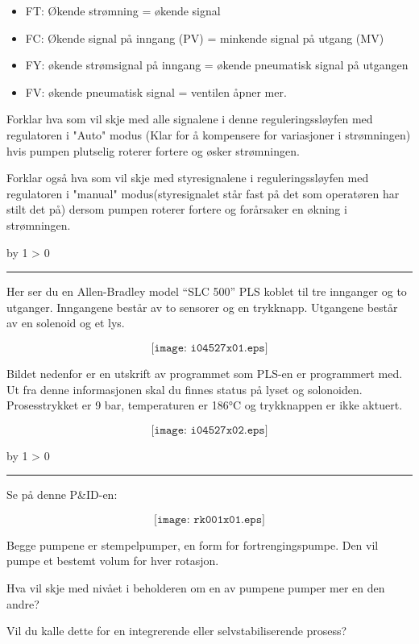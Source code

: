 \documentclass[12pt,a4paper]{article}
\def\oppgave{
            \advance\questnum by 1
            \ifnum \questnum > 0
                 \hrule
                 \vskip 3pt
                 \leftline{Oppgave \the\questnum}
                 \vskip 3pt \fi}
\begin{document}
\begin{itemize}
\item{} FT: Økende strømning = økende signal
\item{} FC: Økende signal på inngang (PV) = minkende signal på utgang (MV) 
\item{} FY: økende strømsignal på inngang = økende pneumatisk signal på utgangen 
\item{} FV: økende pneumatisk signal = ventilen åpner mer.
\end{itemize}

Forklar hva som  vil skje med alle signalene i denne reguleringssløyfen med regulatoren i "Auto" modus (Klar for å kompensere for variasjoner i strømningen) hvis pumpen plutselig roterer fortere og øsker strømningen. 

Forklar også hva som vil skje med styresignalene i reguleringssløyfen med regulatoren i "manual" modus(styresignalet står fast på det som operatøren har stilt det på) dersom pumpen roterer fortere og forårsaker en økning i strømningen. 



\vskip 10pt \filbreak 
\oppgave{} 

Her ser du en Allen-Bradley model ``SLC 500'' PLS koblet til tre innganger og to utganger. Inngangene består av to sensorer og en trykknapp. Utgangene består av en solenoid og et lys. 

$$\texttt{[image: i04527x01.eps]}$$

Bildet nedenfor er en utskrift av programmet som PLS-en er programmert med. Ut fra denne informasjonen skal du finnes status på  lyset og solonoiden. Prosesstrykket er  9 bar, temperaturen er 186°C og trykknappen er ikke aktuert. 

$$\texttt{[image: i04527x02.eps]}$$

\eject
\vskip 10pt \filbreak 
\oppgave{} 

Se på denne P\&ID-en:

$$\texttt{[image: rk001x01.eps]}$$

Begge pumpene er stempelpumper, en form for fortrengingspumpe. Den vil pumpe et bestemt volum for hver rotasjon. 

Hva vil skje med nivået i beholderen om en av pumpene  pumper mer en den andre?
 
\vskip 10pt

Vil du kalle dette for en integrerende eller selvstabiliserende prosess?

\vskip 10pt \filbreak 
\end{document}
